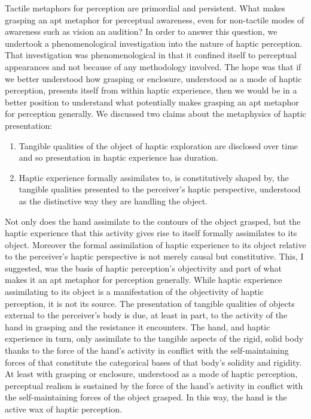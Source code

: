 Tactile metaphors for perception are primordial and persistent. What makes grasping an apt metaphor for perceptual awareness, even for non-tactile modes of awareness such as vision an audition? In order to answer this question, we undertook a phenomenological investigation into the nature of haptic perception. That investigation was phenomenological in that it confined itself to perceptual appearances and not because of any methodology involved. The hope was that if we better understood how grasping or enclosure, understood as a mode of haptic perception, presents itself from within haptic experience, then we would be in a better position to understand what potentially makes grasping an apt metaphor for perception generally. We discussed two claims about the metaphysics of haptic presentation:
\begin{enumerate}
	\item Tangible qualities of the object of haptic exploration are disclosed over time and so presentation in haptic experience has duration.
	\item Haptic experience formally assimilates to, is constitutively shaped by, the tangible qualities presented to the perceiver's haptic perspective, understood as the distinctive way they are handling the object.
\end{enumerate}
Not only does the hand assimilate to the contours of the object grasped, but the haptic experience that this activity gives rise to itself formally assimilates to its object. Moreover the formal assimilation of haptic experience to its object relative to the perceiver's haptic perspective is not merely causal but constitutive. This, I suggested, was the basis of haptic perception's objectivity and part of what makes it an apt metaphor for perception generally. While haptic experience assimilating to its object is a manifestation of the objectivity of haptic perception, it is not its source. The presentation of tangible qualities of objects external to the perceiver’s body is due, at least in part, to the activity of the hand in grasping and the resistance it encounters. The hand, and haptic experience in turn, only assimilate to the tangible aspects of the rigid, solid body thanks to the force of the hand’s activity in conflict with the self-maintaining forces of that constitute the categorical bases of that body’s solidity and rigidity. At least with grasping or enclosure, understood as a mode of haptic perception, perceptual realism is sustained by the force of the hand’s activity in conflict with the self-maintaining forces of the object grasped. In this way, the hand is the active wax of haptic perception.

